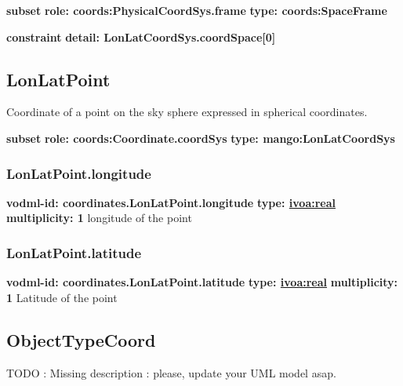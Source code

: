     \noindent \textbf{subset} \newline
    \indent   \textbf{role: coords:PhysicalCoordSys.frame} \newline
    \indent   \textbf{type: coords:SpaceFrame} \newline


    \noindent \textbf{constraint} \newline
    \indent    \textbf{detail: LonLatCoordSys.coordSpace[0] }\newline


  \subsection{LonLatPoint}
  \label{sect:coordinates.LonLatPoint}
    Coordinate of a point on the sky sphere expressed in spherical coordinates.

    \noindent \textbf{subset} \newline
    \indent   \textbf{role: coords:Coordinate.coordSys} \newline
    \indent   \textbf{type: mango:LonLatCoordSys} \newline


    \subsubsection{LonLatPoint.longitude}
      \textbf{vodml-id: coordinates.LonLatPoint.longitude} \newline
      \textbf{type: \hyperref[sect:ivoa]{ivoa:real}} \newline
      \textbf{multiplicity: 1} \newline 
      longitude of the point

    \subsubsection{LonLatPoint.latitude}
      \textbf{vodml-id: coordinates.LonLatPoint.latitude} \newline
      \textbf{type: \hyperref[sect:ivoa]{ivoa:real}} \newline
      \textbf{multiplicity: 1} \newline 
      Latitude of the point

  \subsection{ObjectTypeCoord}
  \label{sect:coordinates.ObjectTypeCoord}
    TODO : Missing description : please, update your UML model asap.

